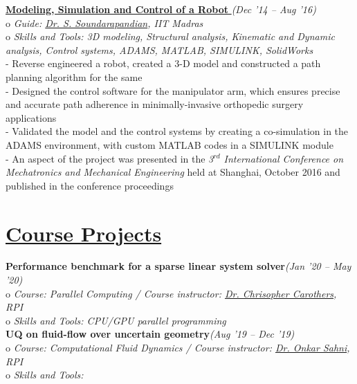 \documentclass[margin,line]{res}
\begin{document}
\begin{resume}
\textbullet\hspace{0.005cm} \href{https://sites.google.com/site/vigneshsrinivasaragavan/research}{{\bf Modeling, Simulation and Control of a Robot }}\hfill {\em (Dec '14 -- Aug '16)}\\
o {\em Guide: \href {https://home.iitm.ac.in/sspandian/} {\color{RoyalPurple} Dr. S. Soundarapandian}, IIT Madras}\\
o {\em Skills and Tools: 3D modeling, Structural analysis, Kinematic and Dynamic analysis, Control systems, ADAMS, MATLAB, SIMULINK, SolidWorks}\\
- Reverse engineered a robot, created a 3-D model and constructed a path planning algorithm for the same \\
- Designed the control software for the manipulator arm, which ensures precise and accurate path adherence in minimally-invasive orthopedic surgery applications \\
- Validated the model and the control systems by creating a co-simulation in the ADAMS environment, with custom MATLAB codes in a SIMULINK module \\
- An aspect of the project was presented in the {\em 3$^{rd}$ International Conference on Mechatronics and Mechanical Engineering} held at Shanghai, October 2016 and published in the conference proceedings

\section {\sc \href{https://vickyragav95.github.io/project.html}{\color{RoyalPurple}Course Projects}}
\textbullet\hspace{0.005cm} {\bf Performance benchmark for a sparse linear system solver}\hfill {\em (Jan '20 -- May '20)}\\
o {\em Course: Parallel Computing / Course instructor: \href{https://www.cs.rpi.edu/~chrisc/} {\color{RoyalPurple} Dr. Chrisopher Carothers}, RPI}\\
o {\em Skills and Tools: CPU/GPU parallel programming}\\


\textbullet\hspace{0.005cm} {\bf UQ on fluid-flow over uncertain geometry}\hfill {\em (Aug '19 -- Dec '19)}\\
o {\em Course: Computational Fluid Dynamics / Course instructor: \href {https://homepages.rpi.edu/~sahni/} {\color{RoyalPurple} Dr. Onkar Sahni}, RPI}\\
o {\em Skills and Tools:  }\\



\end{resume}
\end{document}
